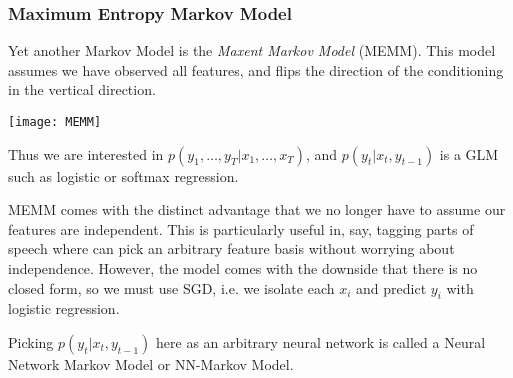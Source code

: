 \documentclass{article}
\begin{document}
\subsubsection{Maximum Entropy Markov Model}
Yet another Markov Model is the \textit{Maxent Markov Model} (MEMM). This model assumes we have observed all features, and flips the direction of the conditioning in the vertical direction.
\begin{center}
\texttt{[image: MEMM]} 
\end{center}
Thus we are interested in $p(y_1,\ldots,y_T | x_1, \ldots, x_T)$, and $p(y_t|x_t,y_{t-1})$ is a GLM such as logistic or softmax regression.

MEMM comes with the distinct advantage that we no longer have to assume our features are independent. This is particularly useful in, say, tagging parts of speech where can pick an arbitrary feature basis without worrying about independence. However, the model comes with the downside that there is no closed form, so we must use SGD, i.e. we isolate each $x_i$ and predict $y_i$ with logistic regression.

Picking $p(y_t|x_t,y_{t-1})$ here as an arbitrary neural network is called a Neural Network Markov Model or NN-Markov Model. 
\end{document}
